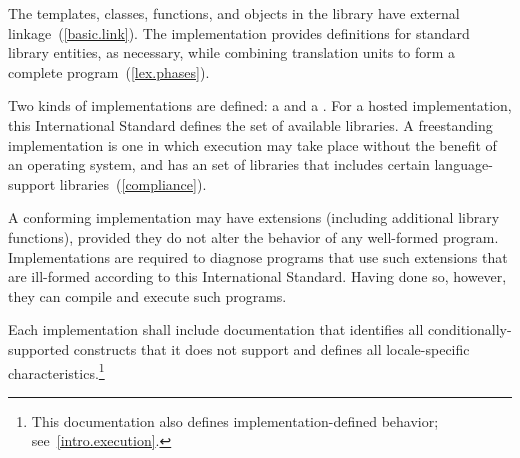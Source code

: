 \pnum
The templates, classes, functions, and objects in the library have
external linkage~(\ref{basic.link}). The implementation provides
definitions for standard library entities, as necessary, while combining
translation units to form a complete \Cpp  program~(\ref{lex.phases}).%

\pnum
Two kinds of implementations are defined: a  and a
. For a hosted implementation, this
International Standard defines the set of available libraries. A freestanding
implementation is one in which execution may take place without the benefit of
an operating system, and has an  set of libraries that includes certain language-support
libraries~(\ref{compliance}). 

\pnum
A conforming implementation may have extensions (including
additional library functions), provided they do not alter the
behavior of any well-formed program.
Implementations are required to diagnose programs that use such
extensions that are ill-formed according to this International Standard.
Having done so, however, they can compile and execute such programs.

\pnum
Each implementation shall include documentation that identifies all
conditionally-supported constructs
that it does not support and defines all locale-specific characteristics.\footnote{This documentation also defines implementation-defined behavior;
see~\ref{intro.execution}.}%
%
%

